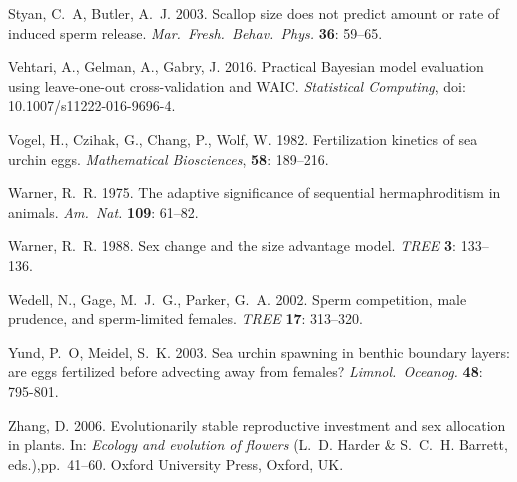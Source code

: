 \documentclass{article}
\begin{document}
\begin{thebibliography}{}
Styan, C.~A, Butler, A.~J. 2003.
\newblock Scallop size does not predict amount or rate of induced sperm release.
\newblock \textit{Mar.~Fresh.~Behav.~Phys.} \textbf{36}: 59--65.

Vehtari, A., Gelman, A., Gabry, J. 2016.
\newblock Practical Bayesian model evaluation using leave-one-out cross-validation and WAIC.
\newblock \textit{Statistical Computing}, doi: 10.1007/s11222-016-9696-4.

Vogel, H., Czihak, G., Chang, P., Wolf, W. 1982.
\newblock Fertilization kinetics of sea urchin eggs.
\newblock \textit{Mathematical Biosciences}, \textbf{58}: 189--216.

Warner, R.~R. 1975.
\newblock The adaptive significance of sequential hermaphroditism in animals.
\newblock \textit{Am.~Nat.} \textbf{109}: 61--82.

Warner, R.~R. 1988.
\newblock Sex change and the size advantage model.
\newblock \textit{TREE} \textbf{3}: 133--136.

Wedell, N., Gage, M.~J.~G., Parker, G.~A. 2002.
\newblock Sperm competition, male prudence, and sperm-limited females.
\newblock \textit{TREE} \textbf{17}: 313--320.

Yund, P.~O, Meidel, S.~K. 2003.
\newblock Sea urchin spawning in benthic boundary layers: are eggs fertilized before advecting away from females?
\newblock \textit{Limnol.~Oceanog.} \textbf{48}: 795-801.

Zhang, D. 2006.
\newblock Evolutionarily stable reproductive investment and sex allocation in plants.
\newblock In: \textit{Ecology and evolution of flowers} (L.~D. Harder \& S.~C.~H. Barrett, eds.),pp.~41--60. Oxford University Press, Oxford, UK.


\end{thebibliography}
\end{document}
